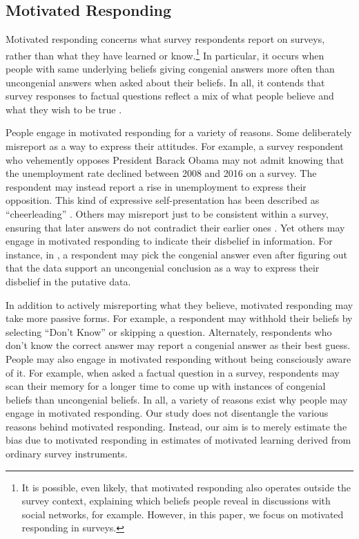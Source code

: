 \documentclass[12pt,letterpaper]{article}
\begin{document}
\subsection*{Motivated Responding}

Motivated responding concerns what survey respondents report on surveys, rather than what they have learned or know.\footnote{It is possible, even likely, that motivated responding also operates outside the survey context, explaining which beliefs people reveal in discussions with social networks, for example. However, in this paper, we focus on motivated responding in surveys.} In particular, it occurs when people with same underlying beliefs giving congenial answers more often than uncongenial answers when asked about their beliefs. In all, it contends that survey responses to factual questions reflect a mix of what people believe and what they wish to be true \citep{luskin2013, prior2015}.

People engage in motivated responding for a variety of reasons. Some deliberately misreport as a way to express their attitudes. For example, a survey respondent who vehemently opposes President Barack Obama may not admit knowing that the unemployment rate declined between 2008 and 2016 on a survey. The respondent may instead report a rise in unemployment to express their opposition. This kind of expressive self-presentation has been described as ``cheerleading'' \citep[e.g.,][]{gerber2009}. Others may misreport just to be consistent within a survey, ensuring that later answers do not contradict their earlier ones \citep[e.g.,][]{sears1983, lau1990, wilcox1993, palmer2001}. Yet others may engage in motivated responding to indicate their disbelief in information. For instance, in \citet{kahan2017}, a respondent may pick the congenial answer even after figuring out that the data support an uncongenial conclusion as a way to express their disbelief in the putative data.

In addition to actively misreporting what they believe, motivated responding may take more passive forms. For example, a respondent may withhold their beliefs by selecting ``Don't Know'' or skipping a question. Alternately, respondents who don't know the correct answer may report a congenial answer as their best guess. People may also engage in motivated responding without being consciously aware of it. For example, when asked a factual question in a survey, respondents may scan their memory for a longer time to come up with instances of congenial beliefs than uncongenial beliefs. In all, a variety of reasons exist why people may engage in motivated responding. Our study does not disentangle the various reasons behind motivated responding. Instead, our aim is to merely estimate the bias due to motivated responding in estimates of motivated learning derived from ordinary survey instruments.
\end{document}
